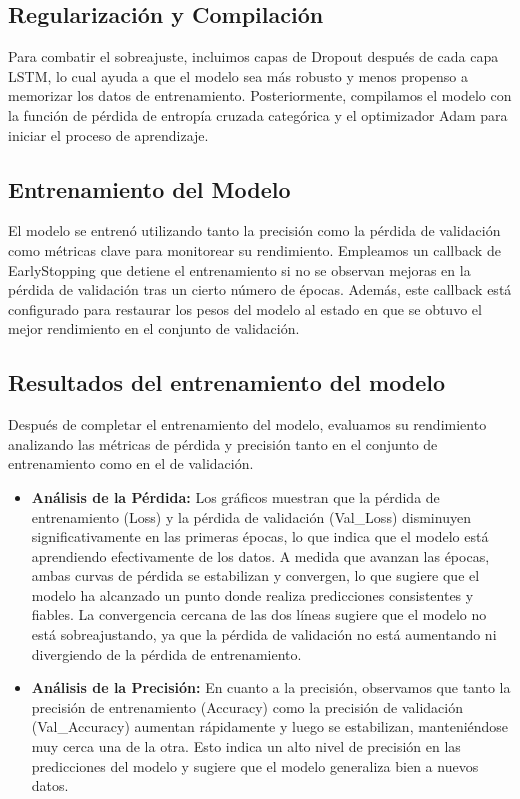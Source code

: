 \subsection{Regularización y Compilación}

Para combatir el sobreajuste, incluimos capas de Dropout después de cada capa LSTM, lo cual ayuda a que el modelo sea más robusto y menos propenso a memorizar los datos de entrenamiento. Posteriormente, compilamos el modelo con la función de pérdida de entropía cruzada categórica y el optimizador Adam para iniciar el proceso de aprendizaje.

\subsection{Entrenamiento del Modelo}

El modelo se entrenó utilizando tanto la precisión como la pérdida de validación como métricas clave para monitorear su rendimiento. Empleamos un callback de EarlyStopping que detiene el entrenamiento si no se observan mejoras en la pérdida de validación tras un cierto número de épocas. Además, este callback está configurado para restaurar los pesos del modelo al estado en que se obtuvo el mejor rendimiento en el conjunto de validación.

\subsection{Resultados del entrenamiento del modelo}

Después de completar el entrenamiento del modelo, evaluamos su rendimiento analizando las métricas de pérdida y precisión tanto en el conjunto de entrenamiento como en el de validación.

\begin{itemize}
    \item \textbf{Análisis de la Pérdida:} Los gráficos muestran que la pérdida de entrenamiento (Loss) y la pérdida de validación (Val\_Loss) disminuyen significativamente en las primeras épocas, lo que indica que el modelo está aprendiendo efectivamente de los datos. A medida que avanzan las épocas, ambas curvas de pérdida se estabilizan y convergen, lo que sugiere que el modelo ha alcanzado un punto donde realiza predicciones consistentes y fiables. La convergencia cercana de las dos líneas sugiere que el modelo no está sobreajustando, ya que la pérdida de validación no está aumentando ni divergiendo de la pérdida de entrenamiento.
    \item \textbf{Análisis de la Precisión:} En cuanto a la precisión, observamos que tanto la precisión de entrenamiento (Accuracy) como la precisión de validación (Val\_Accuracy) aumentan rápidamente y luego se estabilizan, manteniéndose muy cerca una de la otra. Esto indica un alto nivel de precisión en las predicciones del modelo y sugiere que el modelo generaliza bien a nuevos datos.
\end{itemize}

